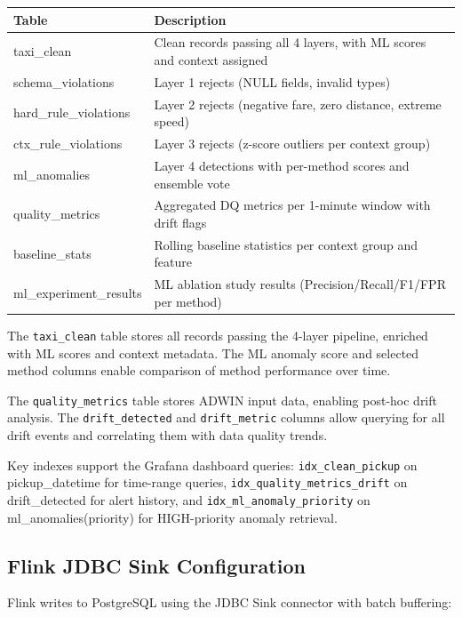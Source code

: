 \begin{longtable}{|m{4cm}|m{9.5cm}|}
\hline
\textbf{Table} & \textbf{Description} \\ \hline
taxi\_clean & Clean records passing all 4 layers, with ML scores and context assigned \\ \hline
schema\_violations & Layer 1 rejects (NULL fields, invalid types) \\ \hline
hard\_rule\_violations & Layer 2 rejects (negative fare, zero distance, extreme speed) \\ \hline
ctx\_rule\_violations & Layer 3 rejects (z-score outliers per context group) \\ \hline
ml\_anomalies & Layer 4 detections with per-method scores and ensemble vote \\ \hline
quality\_metrics & Aggregated DQ metrics per 1-minute window with drift flags \\ \hline
baseline\_stats & Rolling baseline statistics per context group and feature \\ \hline
ml\_experiment\_results & ML ablation study results (Precision/Recall/F1/FPR per method) \\ \hline
\end{longtable}

The \texttt{taxi\_clean} table stores all records passing the 4-layer pipeline, enriched with ML scores and context metadata. The ML anomaly score and selected method columns enable comparison of method performance over time.

The \texttt{quality\_metrics} table stores ADWIN input data, enabling post-hoc drift analysis. The \texttt{drift\_detected} and \texttt{drift\_metric} columns allow querying for all drift events and correlating them with data quality trends.

Key indexes support the Grafana dashboard queries: \texttt{idx\_clean\_pickup} on pickup\_datetime for time-range queries, \texttt{idx\_quality\_metrics\_drift} on drift\_detected for alert history, and \texttt{idx\_ml\_anomaly\_priority} on ml\_anomalies(priority) for HIGH-priority anomaly retrieval.

\subsection{Flink JDBC Sink Configuration}

Flink writes to PostgreSQL using the JDBC Sink connector with batch buffering:

